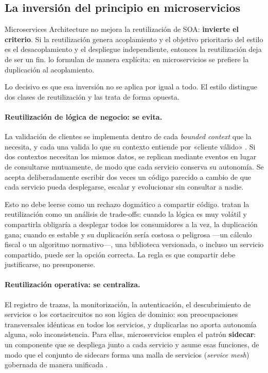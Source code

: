 \subsection{La inversión del principio en microservicios}

Microservices Architecture no mejora la reutilización de SOA: \textbf{invierte el criterio}. Si la reutilización genera acoplamiento y el objetivo prioritario del estilo es el desacoplamiento y el despliegue independiente, entonces la reutilización deja de ser un fin. \textcite{richardsford2020} lo formulan de manera explícita: en microservicios se prefiere la duplicación al acoplamiento.

Lo decisivo es que esa inversión no se aplica por igual a todo. El estilo distingue dos clases de reutilización y las trata de forma opuesta.

\paragraph{Reutilización de lógica de negocio: se evita.} La validación de clientes se implementa dentro de cada \emph{bounded context} que la necesita, y cada una valida lo que su contexto entiende por «cliente válido» \parencite{evans2003}. Si dos contextos necesitan los mismos datos, se replican mediante eventos en lugar de consultarse mutuamente, de modo que cada servicio conserva su autonomía. Se acepta deliberadamente escribir dos veces un código parecido a cambio de que cada servicio pueda desplegarse, escalar y evolucionar sin consultar a nadie.

Esto no debe leerse como un rechazo dogmático a compartir código. \textcite{fordhardparts2021} tratan la reutilización como un análisis de trade-offs: cuando la lógica es muy volátil y compartirla obligaría a desplegar todos los consumidores a la vez, la duplicación gana; cuando es estable y su duplicación sería costosa o peligrosa ---un cálculo fiscal o un algoritmo normativo---, una biblioteca versionada, o incluso un servicio compartido, puede ser la opción correcta. La regla es que compartir debe justificarse, no presuponerse.

\paragraph{Reutilización operativa: se centraliza.} El registro de trazas, la monitorización, la autenticación, el descubrimiento de servicios o los cortacircuitos no son lógica de dominio: son preocupaciones transversales idénticas en todos los servicios, y duplicarlas no aporta autonomía alguna, solo inconsistencia. Para ellas, microservicios emplea el patrón \textbf{sidecar}: un componente que se despliega junto a cada servicio y asume esas funciones, de modo que el conjunto de sidecars forma una malla de servicios (\emph{service mesh}) gobernada de manera unificada \parencite{richardsford2020}.

